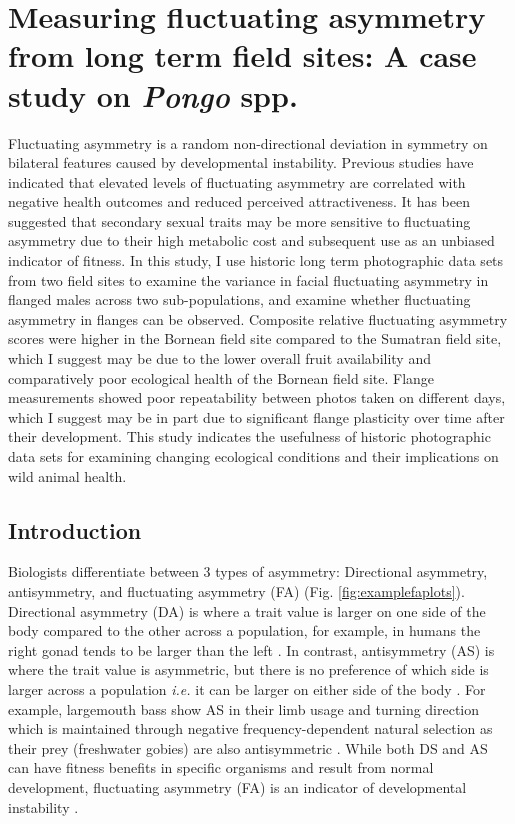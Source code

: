 \ifpdf
    \graphicspath{{Chapter2/Figs/Raster/}{Chapter2/Figs/PDF/}{Chapter2/Figs/}}
\else
    \graphicspath{{Chapter2/Figs/Vector/}{Chapter2/Figs/}}
\fi
\chapter{Measuring fluctuating asymmetry from long term field sites: A case study on \textit{Pongo} spp.}

Fluctuating asymmetry is a random non-directional deviation in symmetry on bilateral features caused by developmental instability. Previous studies have indicated that elevated levels of fluctuating asymmetry are correlated with negative health outcomes and reduced perceived attractiveness. It has been suggested that secondary sexual traits may be more sensitive to fluctuating asymmetry due to their high metabolic cost and subsequent use as an unbiased indicator of fitness. In this study, I use historic long term photographic data sets from two field sites to examine the variance in facial fluctuating asymmetry in flanged males across two sub-populations, and examine whether fluctuating asymmetry in flanges can be observed. Composite relative fluctuating asymmetry scores were higher in the Bornean field site compared to the Sumatran field site, which I suggest may be due to the lower overall fruit availability and comparatively poor ecological health of the Bornean field site. Flange measurements showed poor repeatability between photos taken on different days, which I suggest may be in part due to significant flange plasticity over time after their development. This study indicates the usefulness of historic photographic data sets for examining changing ecological conditions and their implications on wild animal health.
 \pagebreak

\section{Introduction}
Biologists differentiate between 3 types of asymmetry: Directional asymmetry, antisymmetry, and fluctuating asymmetry (FA) (Fig. \ref{fig:examplefaplots}). Directional asymmetry (DA) is where a trait value is larger on one side of the body compared to the other across a population, for example, in humans the right gonad tends to be larger than the left \citep{MITTWOCH.1975}. In contrast, antisymmetry (AS) is where the trait value is asymmetric, but there is no preference of which side is larger across a population \textit{i.e.} it can be larger on either side of the body \citep{Zakharov.20223bp}. For example, largemouth bass show AS in their limb usage and turning direction which is maintained through negative frequency-dependent natural selection as their prey (freshwater gobies) are also antisymmetric \citep{Yasugi.2012}. While both DS and AS can have fitness benefits in specific organisms and result from normal development, fluctuating asymmetry (FA) is an indicator of developmental instability \citep{Valen.1962}.


